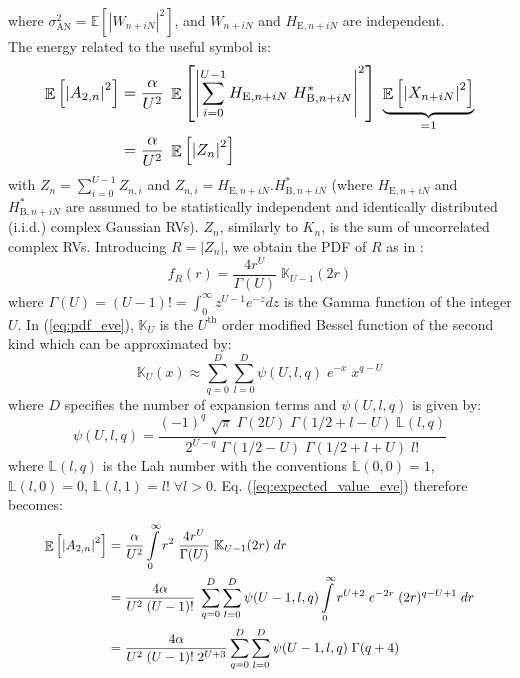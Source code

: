 \documentclass[conference]{IEEEtran}
\begin{document}
where $\sigma^2_{\text{AN}} = \mathbb{E}\left[\left| W_{n+iN} \right|^2 \right]$, and $W_{n+iN}$ and $H_{\text{E}, n + iN}$ are independent.\\
The energy related to the useful symbol is:
\begin{equation}
\resizebox{0.89\hsize}{!}{$
    \begin{split}
         \mathop{\mathbb{E}}\left[ \left| A_{2,n} \right|^2 \right]
         &= \frac{\alpha}{U^2}\; \mathop{\mathbb{E}}\left[ \left| \sum_{i=0}^{U-1}  H_{\text{E},n+iN} \; H^*_{\text{B},n+iN} \right|^2 \right] \; \underbrace{\mathop{\mathbb{E}}\left[ \left| X_{n+iN}\right|^2 \right]}_{=1} \\
         &= \frac{\alpha}{U^2} \; \mathop{\mathbb{E}}\left[ \left| Z_n \right|^2 \right]
    \end{split}$}
    \label{eq:expected_value_eve}
\end{equation}
with $Z_n = \sum_{i=0}^{U-1} Z_{n,i}$ and $Z_{n,i} = H_{\text{E},n+iN}.H_{\text{B},n+iN}^*$ (where $H_{\text{E},n+iN}$ and $H_{\text{B},n+iN}^*$ are assumed to be statistically independent and identically distributed (i.i.d.) complex Gaussian RVs). $Z_n$, similarly to $K_n$, is  the sum of uncorrelated complex RVs. Introducing $R = | Z_n |$, we obtain the PDF of $R$ as in \cite{TR_FD_TD}:
\begin{equation}
    f_R(r) = \frac{4r^U}{\Gamma(U)} \; \mathbb{K}_{U-1}\left( 2r\right)
    \label{eq:pdf_eve}
\end{equation}
where $\Gamma(U) = (U-1)! = \int_0^\infty z^{U-1} e^{-z} dz$ is the Gamma function of the integer $U$. In (\ref{eq:pdf_eve}), $\mathbb{K}_{U}$ is the $U^{\text{th}}$ order modified Bessel function of the second kind which can be approximated by:
\begin{equation}
    \mathbb{K}_{U}(x) \approx \sum_{q=0}^{D}\sum_{l=0}^{D} \psi(U,l,q) \; e^{-x} \; x^{q-U}
\end{equation}
where $D$ specifies the number of expansion terms and $\psi(U,l,q)$ is given by:
\begin{equation}
    \psi(U,l,q) = \frac{(-1)^q \; \sqrt{\pi} \; \Gamma(2U) \; \Gamma(1/2+l-U) \; \mathbb{L}(l,q)}{2^{U-q}\; \Gamma(1/2-U) \; \Gamma(1/2+l+U) \; l!}
\end{equation}
where $\mathbb{L}(l,q)$ is the Lah number \cite{TR_la} with the conventions $\mathbb{L}(0,0) = 1$,  $\mathbb{L}(l,0) = 0$,  $\mathbb{L}(l,1) = l! \; \forall l > 0$. Eq. (\ref{eq:expected_value_eve}) therefore becomes: 
\begin{equation}
\resizebox{0.89\hsize}{!}{$
    \begin{split}
        \mathop{\mathbb{E}}\left[ \left| A_{2,n} \right|^2 \right] &= \frac{\alpha}{U^2} \int\limits_{0}^{\infty} r^2 \;\frac{ 4r^U}{\Gamma(U)}\; \mathbb{K}_{U-1}(2r) \; dr \\
        &= \frac{4\alpha}{U^2 \; (U-1)!} \; \sum_{q=0}^{D}\sum_{l=0}^{D} \psi(U-1,l,q) \int\limits_{0}^{\infty} r^{U+2} \; e^{-2r}  \;  (2r)^{q-U+1} \; dr \\
        &=  \frac{4\alpha}{U^2 \; (U-1)!\; 2^{U+3}} \sum_{q=0}^{D}\sum_{l=0}^{D} \psi(U-1,l,q) \; \Gamma(q+4) 
    \end{split}$}
\end{equation}
\end{document}
